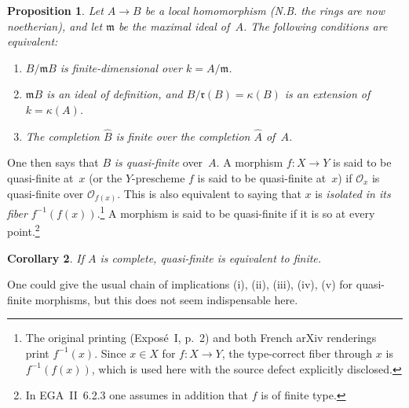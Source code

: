 \documentclass[11pt,oneside]{amsbook}
\newtheorem{proposition}{Proposition}[section]
\newtheorem{corollary}[proposition]{Corollary}
\begin{document}
\begin{proposition}
\label{I.2.1}
Let \(A\to B\) be a local homomorphism (N.B. the rings are now
noetherian), and let \(\mathfrak m\) be the maximal ideal of~\(A\).  The
following conditions are equivalent:
\begin{enumerate}
\item[(i)] \(B/\mathfrak mB\) is finite-dimensional over
  \(k=A/\mathfrak m\).
\item[(ii)] \(\mathfrak mB\) is an ideal of definition, and
  \(B/\mathfrak r(B)=\kappa(B)\) is an extension of
  \(k=\kappa(A)\).
\item[(iii)] The completion \(\widehat B\) is finite over the completion
  \(\widehat A\) of~\(A\).
\end{enumerate}
\end{proposition}

One then says that
\(B\) \emph{is quasi-finite} over~\(A\).  A morphism
\(f\colon X\to Y\) is said to be quasi-finite at~\(x\) (or the
\(Y\)-prescheme \(f\) is said to be quasi-finite at~\(x\)) if
\(\mathcal O_x\) is quasi-finite over \(\mathcal O_{f(x)}\).  This is also
equivalent to saying that \(x\) is \emph{isolated in its fiber}
\(f^{-1}(f(x))\).\footnote{The original printing (Exposé~I, p.~2) and both
French arXiv renderings print \(f^{-1}(x)\).  Since \(x\in X\) for
\(f\colon X\to Y\), the type-correct fiber through \(x\) is
\(f^{-1}(f(x))\), which is used here with the source defect explicitly
disclosed.} A morphism is said to be quasi-finite if it is so at
every point.\footnote{In EGA~II~6.2.3 one assumes in addition that \(f\) is
of finite type.}

\begin{corollary}
\label{I.2.2}
If \(A\) is complete, quasi-finite is equivalent to finite.
\end{corollary}

One could give the usual chain of implications \textup{(i), (ii), (iii),
(iv), (v)} for quasi-finite morphisms, but this does not seem indispensable
here.
\end{document}
